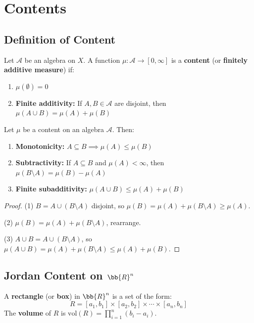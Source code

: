\chapter{Contents}

\section{Definition of Content}

\begin{definition}[Content]
Let $\mathcal{A}$ be an algebra on $X$. A function $\mu: \mathcal{A} \to [0, \infty]$ is a \textbf{content} (or \textbf{finitely additive measure}) if:
\begin{enumerate}
    \item $\mu(\emptyset) = 0$
    \item \textbf{Finite additivity:} If $A, B \in \mathcal{A}$ are disjoint, then $\mu(A \cup B) = \mu(A) + \mu(B)$
\end{enumerate}
\end{definition}

\begin{proposition}
Let $\mu$ be a content on an algebra $\mathcal{A}$. Then:
\begin{enumerate}
    \item \textbf{Monotonicity:} $A \subseteq B \implies \mu(A) \leq \mu(B)$
    \item \textbf{Subtractivity:} If $A \subseteq B$ and $\mu(A) < \infty$, then $\mu(B \setminus A) = \mu(B) - \mu(A)$
    \item \textbf{Finite subadditivity:} $\mu(A \cup B) \leq \mu(A) + \mu(B)$
\end{enumerate}
\end{proposition}

\begin{proof}
(1) $B = A \cup (B \setminus A)$ disjoint, so $\mu(B) = \mu(A) + \mu(B \setminus A) \geq \mu(A)$.

(2) $\mu(B) = \mu(A) + \mu(B \setminus A)$, rearrange.

(3) $A \cup B = A \cup (B \setminus A)$, so $\mu(A \cup B) = \mu(A) + \mu(B \setminus A) \leq \mu(A) + \mu(B)$.
\end{proof}

\section{Jordan Content on $\bb{R}^n$}

\begin{definition}[Rectangle]
A \textbf{rectangle} (or \textbf{box}) in $\bb{R}^n$ is a set of the form:
\[ R = [a_1, b_1] \times [a_2, b_2] \times \cdots \times [a_n, b_n] \]
The \textbf{volume} of $R$ is $\text{vol}(R) = \prod_{i=1}^n (b_i - a_i)$.
\end{definition}

